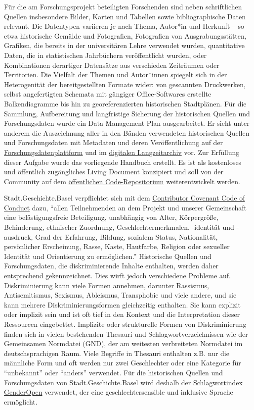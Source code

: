 \documentclass[
  letterpaper,
  DIV=11,
  numbers=noendperiod,
  landscape,
  a4paper,
  geometry:margin=1in]{scrartcl}
\begin{document}
Für die am Forschungsprojekt beteiligten Forschenden sind neben
schriftlichen Quellen insbesondere Bilder, Karten und Tabellen sowie
bibliographische Daten relevant. Die Datentypen variieren je nach Thema,
Autor*in und Herkunft -- so etwa historische Gemälde und Fotografien,
Fotografien von Ausgrabungsstätten, Grafiken, die bereits in der
universitären Lehre verwendet wurden, quantitative Daten, die in
statistischen Jahrbüchern veröffentlicht wurden, oder Kombinationen
derartiger Datensätze aus verschieden Zeiträumen oder Territorien. Die
Vielfalt der Themen und Autor*innen spiegelt sich in der Heterogenität
der bereitgestellten Formate wider: von gescannten Druckwerken, selbst
angefertigten Schemata mit gängiger Office-Softwares erstellte
Balkendiagramme bis hin zu georeferenzierten historischen Stadtplänen.
Für die Sammlung, Aufbereitung und langfristige Sicherung der
historischen Quellen und Forschungsdaten wurde ein Data Management Plan
ausgearbeitet. Er sieht unter anderem die Auszeichnung aller in den
Bänden verwendeten historischen Quellen und Forschungsdaten mit
Metadaten und deren Veröffentlichung auf der
\href{https://forschung.stadtgeschichtebasel.ch/}{Forschungsdatenplattform}
und im
\href{https://zenodo.org/communities/stadt-geschichte-basel/}{digitalen
Langzeitarchiv} vor. Zur Erfüllung dieser Aufgabe wurde das vorliegende
Handbuch erstellt. Es ist als kostenloses und öffentlich zugängliches
Living Document konzipiert und soll von der Community auf dem
\href{https://github.com/maehr/diskriminierungsfreie-metadaten}{öffentlichen
Code-Repositorium} weiterentwickelt werden.

Stadt.Geschichte.Basel verpflichtet sich mit dem
\href{https://www.contributor-covenant.org/version/2/1/code_of_conduct/}{Contributor
Covenant Code of Conduct} dazu, ``allen Teilnehmenden an dem Projekt und
unserer Gemeinschaft eine belästigungsfreie Beteiligung, unabhängig von
Alter, Körpergröße, Behinderung, ethnischer Zuordnung,
Geschlechtermerkmalen, -identität und -ausdruck, Grad der Erfahrung,
Bildung, sozialem Status, Nationalität, persönlicher Erscheinung, Rasse,
Kaste, Hautfarbe, Religion oder sexueller Identität und Orientierung zu
ermöglichen.'' Historische Quellen und Forschungsdaten, die
diskriminierende Inhalte enthalten, werden daher entsprechend
gekennzeichnet. Dies wirft jedoch verschiedene Probleme auf.
Diskriminierung kann viele Formen annehmen, darunter Rassismus,
Antisemitismus, Sexismus, Ableismus, Transphobie und viele andere, und
sie kann mehrere Diskriminierungsformen gleichzeitig enthalten. Sie kann
explizit oder implizit sein und ist oft tief in den Kontext und die
Interpretation dieser Ressourcen eingebettet. Implizite oder
strukturelle Formen von Diskriminierung finden sich in vielen
bestehenden Thesauri und Schlagwortverzeichnissen wie der Gemeinsamen
Normdatei (GND), der am weitesten verbreiteten Normdatei im
deutschsprachigen Raum. Viele Begriffe in Thesauri enthalten z.B. nur
die männliche Form und oft werden nur zwei Geschlechter oder eine
Kategorie für ``unbekannt'' oder ``anders'' verwendet. Für die
historischen Quellen und Forschungsdaten von Stadt.Geschichte.Basel wird
deshalb der
\href{https://opengenderplatform.de/schlagwortindex}{Schlagwortindex
GenderOpen} verwendet, der eine geschlechtersensible und inklusive
Sprache ermöglicht.
\end{document}
